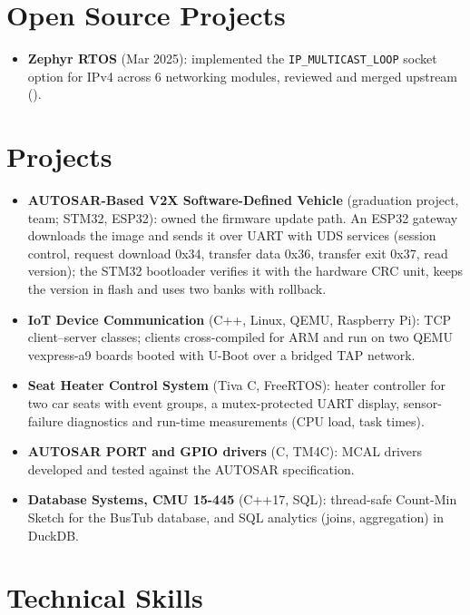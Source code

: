 \documentclass[10pt]{article}
\begin{document}
\section*{Open Source Projects}
\begin{itemize}
  \item \textbf{Zephyr RTOS} (Mar 2025): implemented the \texttt{IP\_MULTICAST\_LOOP} socket option for IPv4 across 6 networking modules, reviewed and merged upstream ().
\end{itemize}

\section*{Projects}
\begin{itemize}
  \item \textbf{AUTOSAR-Based V2X Software-Defined Vehicle} (graduation project, team; STM32, ESP32): owned the firmware update path. An ESP32 gateway downloads the image and sends it over UART with UDS services (session control, request download 0x34, transfer data 0x36, transfer exit 0x37, read version); the STM32 bootloader verifies it with the hardware CRC unit, keeps the version in flash and uses two banks with rollback. 
  \item \textbf{IoT Device Communication} (C++, Linux, QEMU, Raspberry Pi): TCP client--server classes; clients cross-compiled for ARM and run on two QEMU vexpress-a9 boards booted with U-Boot over a bridged TAP network. 
  \item \textbf{Seat Heater Control System} (Tiva C, FreeRTOS): heater controller for two car seats with event groups, a mutex-protected UART display, sensor-failure diagnostics and run-time measurements (CPU load, task times). 
  \item \textbf{AUTOSAR PORT and GPIO drivers} (C, TM4C): MCAL drivers developed and tested against the AUTOSAR specification.
  \item \textbf{Database Systems, CMU 15-445} (C++17, SQL): thread-safe Count-Min Sketch for the BusTub database, and SQL analytics (joins, aggregation) in DuckDB. 
\end{itemize}

\section*{Technical Skills}
\end{document}
